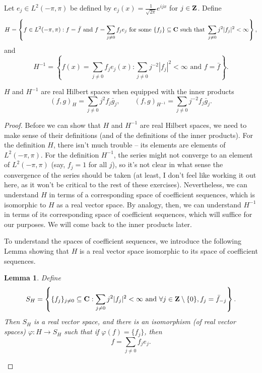 \documentclass{homework}
\newtheorem{lemma}{Lemma}
\begin{document}
	\question
	\newcommand{\ltwo}{L^2(-\pi,\pi)}
	\newcommand{\hm}{{H^{-1}}}
	Let $e_j \in \ltwo$ be defined by $e_j(x) = \frac{1}{\sqrt{2\pi}}e^{ijx}$ for $j \in \textbf{Z}$. Define
	\begin{equation}
		H = \left\{f \in \ltwo : f = \bar{f}\text{ and }f = \sum_{j\ne 0}f_je_j \text{ for some } \{f_j\}\subseteq \C \text{ such that } \sum_{j\ne 0} j^2|f_j|^2 < \infty \right\},
	\end{equation}
	and
	\begin{equation}
		\hm = \left\{f(x) = \sum_{j\ne 0}f_je_j(x) : \sum_{j\ne 0}j^{-2}|f_j |^2 < \infty \text{ and } f = \bar{f}\right\}.
	\end{equation}
	\begin{arabicparts}
		\questionpart
		$H$ and $\hm$ are real Hilbert spaces when equipped with the inner products
		\begin{equation}
			(f,g)_H = \sum_{j\ne 0}j^2f_j\bar{g}_j,\qquad(f,g)_\hm = \sum_{j\ne 0}j^{-2}f_j\bar{g}_j.
		\end{equation}
		
		\begin{proof}
		Before we can show that $H$ and $\hm$ are real Hilbert spaces, we need to make sense of their definitions (and of the definitions of the inner products). For the definition $H$, there isn't much trouble -- its elements are elements of $\ltwo$. For the definition $H^{-1}$, the series might not converge to an element of $\ltwo$ (say, $f_j = 1$ for all $j$), so it's not clear in what sense the convergence of the series should be taken (at least, I don't feel like working it out here, as it won't be critical to the rest of these exercises). Nevertheless, we can understand $H$ in terms of a corresponding space of coefficient sequences, which is isomorphic to $H$ as a real vector space. By analogy, then, we can understand $H^{-1}$ in terms of its corresponding space of coefficient sequences, which will suffice for our purposes. We will come back to the inner products later.
		
		To understand the spaces of coefficient sequences, we introduce the following Lemma showing that $H$ is a real vector space isomorphic to its space of coefficient sequences.
		\begin{lemma}
		Define
		\begin{equation}
			S_H = \left\{\{f_j\}_{j \ne 0} \subseteq \textbf{C} : \sum_{j\ne 0}j^2|f_j|^2 < \infty \textnormal{ and } \forall j \in \textbf{Z} \setminus\{0\}, f_j = \bar{f}_{-j} \right\}.
		\end{equation}
		Then $S_H$ is a real vector space, and there is an isomorphism (of real vector spaces) $\varphi : H \to S_H$ such that if $\varphi(f) = \{f_j\}$, then
		\begin{equation}
			f = \sum_{j\ne 0}f_je_j.
		\end{equation}
		

\end{lemma}
\end{proof}
\end{arabicparts}
\end{document}
